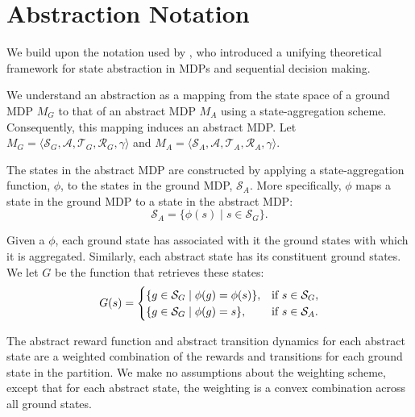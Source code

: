 \section{Abstraction Notation}
We build upon the notation used by \citep{li2006towards}, who introduced a unifying theoretical framework for state abstraction in \acp{MDP} and sequential decision making.

We understand an abstraction as a mapping from the state space of a ground MDP $M_G$ to that of an abstract MDP $M_A$ using a state-aggregation scheme. Consequently, this mapping induces an abstract MDP. Let $M_G = \langle \mathcal{S}_G, \mathcal{A}, \mathcal{T}_G, \mathcal{R}_G, \gamma \rangle$ and $M_A = \langle \mathcal{S}_A, \mathcal{A}, \mathcal{T}_A, \mathcal{R}_A, \gamma \rangle$.
\edefn

The states in the abstract \ac{MDP} are constructed by applying a state-aggregation function, $\phi$, to the states in the ground \ac{MDP}, $\mathcal{S}_A$. More specifically, $\phi$ maps a state in the ground \ac{MDP} to a state in the abstract \ac{MDP}:
\begin{equation}
\mathcal{S}_A = \{ \phi(s) \mid s \in \mathcal{S}_G\}.
\end{equation}
\edefn


Given a $\phi$, each ground state has associated with it the ground states with which it is aggregated. Similarly, each abstract state has its constituent ground states. We let $G$ be the function that retrieves these states:
\begin{equation}
G(s)=
\begin{cases}
\{g \in \mathcal{S}_G \mid \phi(g) = \phi(s) \},& \text{if } s \in \mathcal{S}_G,\\
\{g \in \mathcal{S}_G \mid \phi(g)=s \},& \text{if } s \in \mathcal{S}_A.
\end{cases}
\end{equation}
\edefn

The abstract reward function and abstract transition dynamics for each abstract state are a weighted combination of the rewards and transitions for each ground state in the partition. We make no assumptions about the weighting scheme, except that for each abstract state, the weighting is a convex combination across all ground states.


